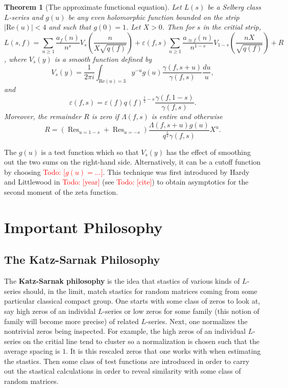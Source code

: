 \documentclass[12pt]{book}
\newtheorem{theorem}{Theorem}[section]
\theoremstyle{definition}\newframedtheorem{method}{Method}
\newcommand{\g}{\gamma}
\renewcommand{\L}{\Lambda}
\newcommand{\e}{\varepsilon}
\newcommand{\<}{\langle}
\renewcommand{\>}{\rangle}
\DeclareMathOperator*{\Res}{\mathrm{Res}}
\renewcommand{\Re}{\mathrm{Re}}
\newcommand{\todo}[1]{\textcolor{red}{\sf Todo: [#1]}}
\begin{document}
      \begin{theorem}[The approximate functional equation]
        Let $L(s)$ be a Selberg class $L$-series and $g(u)$ be any even holomorphic function bounded on the strip $|\Re(u)| < 4$ and such that $g(0) = 1$. Let $X > 0$. Then for $s$ in the critial strip,
        \[
          L(s,f) = \sum_{n \ge 1}\frac{a_{f}(n)}{n^{s}}V_{s}\left(\frac{n}{X\sqrt{q(f)}}\right)+\e(f,s)\sum_{n \ge 1}\frac{a_{\cong{f}}(n)}{n^{1-s}}V_{1-s}\left(\frac{nX}{\sqrt{q(f)}}\right)+R
        \],
        where $V_{s}(y)$ is a smooth function defined by
        \[
          V_{s}(y) = \frac{1}{2\pi i}\int_{\Re(u) = 3}y^{-u}g(u)\frac{\g(f,s+u)}{\g(f,s)}\frac{du}{u},
        \]
        and
        \[
          \e(f,s) = \e(f)q(f)^{\frac{1}{2}-s}\frac{\g(f,1-s)}{\g(f,s)}.
        \]
        Moreover, the remainder $R$ is zero if $\L(f,s)$ is entire and otherwise
        \[
          R = \left(\Res_{u = 1-s}+\Res_{u = -s}\right)\frac{\L(f,s+u)g(u)}{q^{\frac{s}{2}}\g(f,s)}X^{u}.
        \]
      \end{theorem}

      The $g(u)$ is a test function which so that $V_{s}(y)$ has the effect of smoothing out the two sums on the right-hand side. Alternatively, it can be a cutoff function by choosing \todo{$g(u) = ...$}. This technique was first introduced by Hardy and Littlewood in \todo{year} (see \todo{cite}) to obtain asymptotics for the second moment of the zeta function.

  \chapter{Important Philosophy}
    \section{The Katz-Sarnak Philosophy}
      The \textbf{Katz-Sarnak philosophy} is the idea that stastics of various kinds of $L$-series should, in the limit, match stastics for random matrices coming from some particular classical compact group. One starts with some class of zeros to look at, say high zeros of an individal $L$-series or low zeros for some family (this notion of family will become more precise) of related $L$-series. Next, one normalizes the nontrivial zeros being inspected. For example, the high zeros of an individual $L$-series on the critial line tend to cluster so a normalization is chosen such that the average spacing is $1$. It is this rescaled zeros that one works with when estimating the stastics. Then some class of test functions are introduced in order to carry out the stastical calculations in order to reveal similarity with some class of random matrices.
\end{document}
